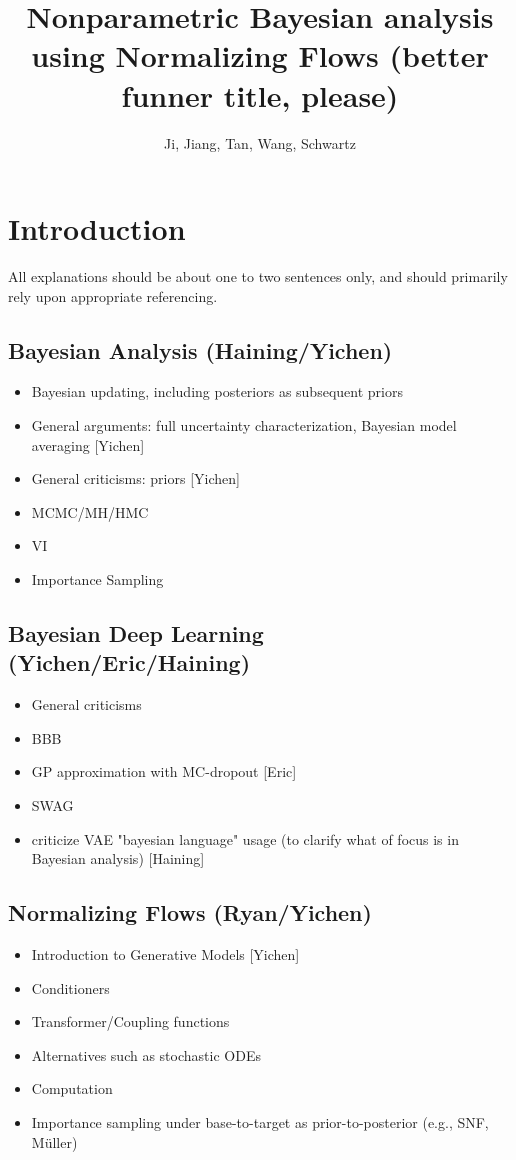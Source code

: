 \documentclass[11pt, oneside]{article}   	%
\title{Nonparametric Bayesian analysis using Normalizing Flows (better funner title, please)}
\author{Ji, Jiang, Tan, Wang, Schwartz}
\begin{document}
\maketitle

\section{Introduction}

All explanations should be about one to two sentences only, and should primarily rely upon appropriate referencing.

\subsection{Bayesian Analysis (Haining/Yichen)}
\begin{itemize}
\item Bayesian updating, including posteriors as subsequent priors
\item General arguments: full uncertainty characterization, Bayesian model averaging [Yichen]
\item General criticisms: priors [Yichen]
\item MCMC/MH/HMC
\item VI
\item Importance Sampling
\end{itemize}

\subsection{Bayesian Deep Learning (Yichen/Eric/Haining)}
\begin{itemize}
\item General criticisms
\item BBB
\item GP approximation with MC-dropout [Eric]
\item SWAG
\item criticize VAE "bayesian language" usage (to clarify what of focus is in Bayesian analysis) [Haining] 
\end{itemize}

\subsection{Normalizing Flows (Ryan/Yichen)}
\begin{itemize}
\item Introduction to Generative Models [Yichen]
\item Conditioners
\item Transformer/Coupling functions
\item Alternatives such as stochastic ODEs
\item Computation
\item Importance sampling under base-to-target as prior-to-posterior (e.g., SNF, Müller)
\end{itemize}
\end{document}
